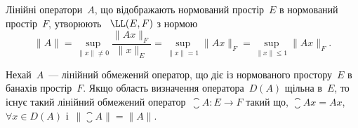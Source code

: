 \begin{definition}
Лінійні оператори~$A$, що відображають
нормований простір~$E$ в нормований простір~$F$, утворюють
~$\LL(E, F)$ з нормою
\begin{equation*}
    \|A\| = \sup_{\|x\| \ne 0} \frac{\|A x\|_F}{\|x\|_E} =
    \sup_{\|x\| = 1} \|A x\|_F = \sup_{\|x\| \le 1} \|Ax\|_F.
\end{equation*}
\end{definition}

\begin{theorem}
Нехай~$A$~--- лінійний обмежений оператор,
що діє із нормованого простору~$E$ в банахів простір~$F$. Якщо
область визначення оператора~$D(A)$ щільна в~$E$, то існує
такий лінійний обмежений оператор~$\closure A: E \to F$ такий що,
$\closure A x = A x$, $\forall x \in D(A)$ і~$\|\closure A\| = \|A\|$.
\end{theorem}

